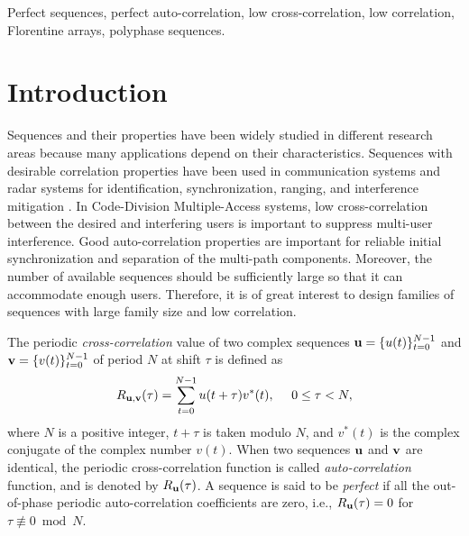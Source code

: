 \documentclass[conference,letterpaper]{IEEEtran}
\theoremstyle{definition}
\begin{document}
\begin{keywords}
Perfect sequences, perfect auto-correlation, low cross-correlation, low correlation,  Florentine arrays, polyphase sequences.
\end{keywords}



\section{Introduction}

Sequences and their properties have been widely studied in  different research areas because many applications depend on their characteristics. %
Sequences with desirable correlation properties have been used in communication systems and radar systems for identification, synchronization, ranging, and interference mitigation \cite{Golomb2005SignalDF}.  
 In Code-Division Multiple-Access systems, low cross-correlation between the desired and interfering users is important to suppress multi-user interference. Good auto-correlation properties are important for reliable initial synchronization and separation of the multi-path components. Moreover, the number of available sequences should be sufficiently large so that it can accommodate enough users. Therefore, it is of great interest to design families of sequences with large family size and low correlation.

The periodic {\it cross-correlation} value of two complex sequences ${\bf u}=\{u(t)\}_{t=0}^{N-1}$ and  ${\bf v}=\{v(t)\}_{t=0}^{N-1}$ of period $N$ at
shift $\tau$ is defined as
\begin{eqnarray*}
R_{{\bf u}, {\bf v}}(\tau)=\sum_{t=0}^{N-1}u(t+\tau) v^*(t), ~~~~0\leq \tau
<N,
\end{eqnarray*}
where $N$ is a positive integer, $t+\tau$  is taken modulo $N$, and $v^*(t)$ is the
complex conjugate of  the complex number $v(t)$. When two sequences ${\bf u}$ and ${\bf v}$ are identical, the  periodic  cross-correlation function  is called {\it auto-correlation}	function, and is denoted by $R_{{\bf u}}(\tau)$. A sequence is said to be \textit{perfect}
if all the out-of-phase periodic auto-correlation
coefficients are zero, i.e., $R_{{\bf u}}(\tau)=0$ for  $\tau \not \equiv 0  \bmod N$. 
\end{document}
